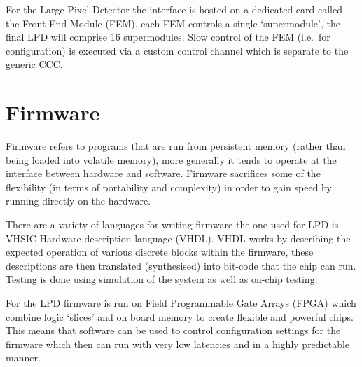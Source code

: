 For the Large Pixel Detector the interface is hosted on a dedicated card called the Front End Module (FEM), each FEM controls a single `supermodule', the final LPD will comprise 16 supermodules. Slow control of the FEM (i.e.\ for configuration) is executed via a custom control channel which is separate to the generic CCC.
\section{Firmware} %
\label{sec:firmware}
Firmware refers to programs that are run from persistent memory (rather than being loaded into volatile memory), more generally it tends to operate at the interface between hardware and software. Firmware sacrifices some of the flexibility (in terms of portability and complexity) in order to gain speed by running directly on the hardware. 

There are a variety of languages for writing firmware the one used for LPD is VHSIC Hardware description language (VHDL). VHDL works by describing the expected operation of various discrete blocks within the firmware, these descriptions are then translated (synthesised) into bit-code that the chip can run. Testing is done using simulation of the system as well as on-chip testing.

For the LPD firmware is run on Field Programmable Gate Arrays (FPGA) which combine logic `slices' and on board memory to create flexible and powerful chips. This means that software can be used to control configuration settings for the firmware which then can run with very low latencies and in a highly predictable manner.


